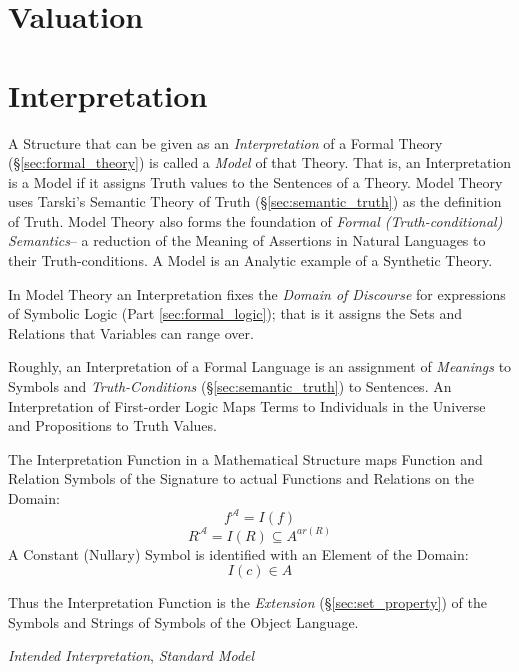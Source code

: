 \section{Valuation}\label{sec:valuation}



\section{Interpretation}\label{sec:interpretation}

A Structure that can be given as an \emph{Interpretation} of a Formal
Theory (\S\ref{sec:formal_theory}) is called a \emph{Model} of that
Theory. That is, an Interpretation is a Model if it assigns Truth
values to the Sentences of a Theory. Model Theory uses Tarski's
Semantic Theory of Truth (\S\ref{sec:semantic_truth}) as the
definition of Truth. Model Theory also forms the foundation of
\emph{Formal (Truth-conditional) Semantics}-- a reduction of the
Meaning of Assertions in Natural Languages to their Truth-conditions.
A Model is an Analytic example of a Synthetic Theory. \cite{shulman15}

In Model Theory an Interpretation fixes the \emph{Domain of Discourse}
for expressions of Symbolic Logic (Part \ref{sec:formal_logic}); that
is it assigns the Sets and Relations that Variables can range over.

Roughly, an Interpretation of a Formal Language is an assignment of
\emph{Meanings} to Symbols and \emph{Truth-Conditions}
(\S\ref{sec:semantic_truth}) to Sentences. An Interpretation of
First-order Logic Maps Terms to Individuals in the Universe and
Propositions to Truth Values.

The Interpretation Function in a Mathematical Structure maps Function
and Relation Symbols of the Signature to actual Functions and
Relations on the Domain:
\[
    f^{\mathcal{A}} = I (f)
\]
\[
    R^{\mathcal{A}} = I (R) \subseteq A^{ar(R)}
\]
A Constant (Nullary) Symbol is identified with an Element of the
Domain:
\[
    I(c) \in A
\]

Thus the Interpretation Function is the \emph{Extension}
(\S\ref{sec:set_property}) of the Symbols and Strings of Symbols of
the Object Language.

\emph{Intended Interpretation}, \emph{Standard Model}

